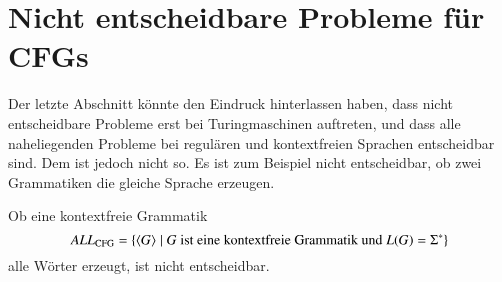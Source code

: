 %
%
%
\section{Nicht entscheidbare Probleme für CFGs}
Der letzte Abschnitt könnte den Eindruck hinterlassen haben,
dass nicht entscheidbare Probleme erst bei Turingmaschinen
auftreten, und dass alle naheliegenden Probleme bei regulären
und kontextfreien Sprachen entscheidbar sind.
Dem ist jedoch nicht so.
Es ist zum Beispiel nicht entscheidbar, ob zwei
Grammatiken die gleiche Sprache erzeugen.

\begin{satz} Ob eine kontextfreie Grammatik
\[
\text{\it ALL}_{\text{CFG}}=\{\langle G\rangle\;|\; \text{$G$
ist eine kontextfreie Grammatik und $L(G)=\Sigma^*$}\}
\]
%
alle Wörter erzeugt, ist nicht entscheidbar.
\end{satz}

